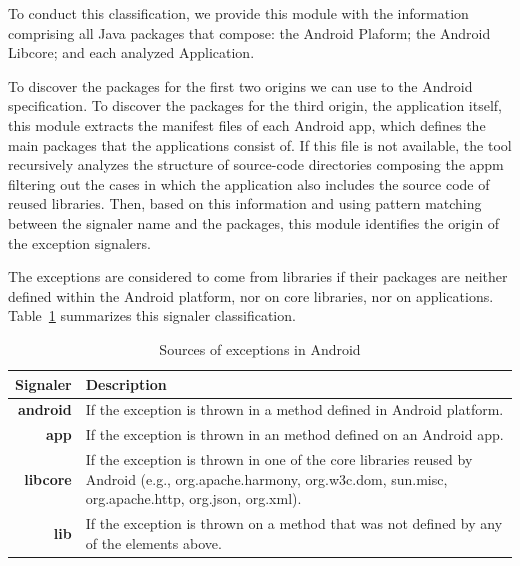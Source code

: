 \documentclass[conference]{IEEEtran}
\begin{document}
To conduct this classification, we provide this module with the information
comprising all Java packages that compose: the Android Plaform;
 the Android Libcore; and each analyzed Application. 

To discover the packages for the first two origins
we can use to the Android specification.
To discover the packages for the third origin, the application itself, this module
extracts the manifest files of each Android app, which defines the main packages that the applications consist of.
 If this file is not available, the tool recursively analyzes the 
structure of source-code directories composing the appm filtering out the cases in which the application also includes the source code of reused libraries.
Then, based on this information and using pattern matching 
between the signaler name and the packages, this module identifies 
the origin of the exception signalers. 

The exceptions are considered to come
 from libraries if their packages are neither defined 
within the Android platform, nor on core libraries, nor on applications.
Table~\ref{tab:signalers} summarizes this signaler classification.


\begin{table}
  \centering
  \begin{tabular}{rp{29em}}
    \hline
    \bfseries{Signaler} & \bfseries{Description} \\
    \hline
    \bfseries{android} & If the exception is thrown in a method defined in Android platform.\\
    \bfseries{app}     & If the exception is thrown in an method defined on an Android app.\\
    \bfseries{libcore} & If the exception is thrown in one of the core libraries reused by Android (e.g., org.apache.harmony, org.w3c.dom, sun.misc, org.apache.http, org.json, org.xml). \\
    \bfseries{lib}     & If the exception is thrown on a method that was not defined by any of the elements above.\\
    \hline
  \end{tabular}
  \caption{Sources of exceptions in Android}
  \label{tab:signalers}
\end{table}
\end{document}
